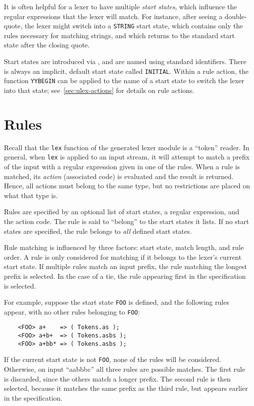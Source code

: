 It is often helpful for a lexer to have multiple \emph{start states}, which influence the regular expressions that the lexer will match.  For instance, after seeing a double-quote, the lexer might switch into a \texttt{STRING} start state, which contains only the rules necessary for matching strings, and which returns to the standard start state after the closing quote.

Start states are introduced via , and are named using standard identifiers.  There is always an implicit, default start state called \texttt{INITIAL}.  Within a rule action, the function \texttt{YYBEGIN} can be applied to the name of a start state to switch the lexer into that state; see~\ref{sec:ulex-actions} for details on rule actions.

\section{Rules}\label{sec:ulex-rules}

Recall that the \texttt{lex} function of the generated lexer module is a ``token'' reader.  In general, when \texttt{lex} is applied to an input stream, it will attempt to match a prefix of the input with a regular expression given in one of the rules.  When a rule is matched, its \emph{action} (associated code) is evaluated and the result is returned.  Hence, all actions must belong to the same type, but no restrictions are placed on what that type is.

Rules are specified by an optional list of start states, a regular expression, and the action code.  The rule is said to ``belong'' to the start states it lists.  If no start states are specified, the rule belongs to \emph{all} defined start states.

Rule matching is influenced by three factors: start state, match length, and rule order.  A rule is only considered for matching if it belongs to the lexer's current start state.  If multiple rules match an input prefix, the rule matching the longest prefix is selected.  In the case of a tie, the rule appearing first in the specification is selected.

For example, suppose the start state {\tt FOO} is defined, and the following rules appear, with no other rules belonging to {\tt FOO}:
\begin{verbatim}
    <FOO> a+    => ( Tokens.as );
    <FOO> a+b+  => ( Tokens.asbs );
    <FOO> a+bb* => ( Tokens.asbs );
\end{verbatim}
If the current start state is not {\tt FOO}, none of the rules will be considered.  Otherwise, on input ``aabbbc'' all three rules are possible matches.  The first rule is discarded, since the others match a longer prefix.  The second rule is then selected, because it matches the same prefix as the third rule, but appears earlier in the specification.

